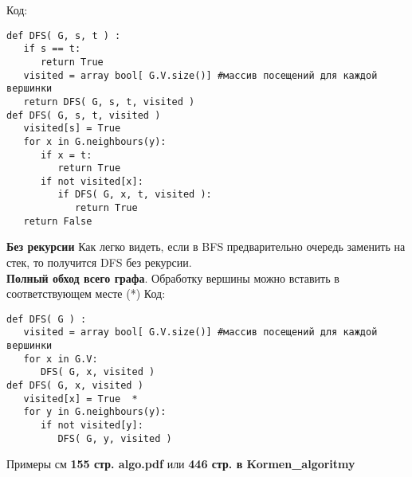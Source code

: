 Код:
\begin{verbatim}
def DFS( G, s, t ) :
   if s == t:
      return True
   visited = array bool[ G.V.size()] #массив посещений для каждой вершинки
   return DFS( G, s, t, visited )
def DFS( G, s, t, visited )
   visited[s] = True
   for x in G.neighbours(y):
      if x = t:
         return True
      if not visited[x]:
         if DFS( G, x, t, visited ):
            return True
   return False
\end{verbatim}
{\bf Без рекурсии} Как легко видеть, если в BFS предварительно очередь заменить на стек, то получится DFS без рекурсии.\\
{\bf Полный обход всего графа}. Обработку вершины можно вставить в соответствующем месте (*) Код:
\begin{verbatim}
def DFS( G ) :
   visited = array bool[ G.V.size()] #массив посещений для каждой вершинки
   for x in G.V:
      DFS( G, x, visited )
def DFS( G, x, visited )
   visited[x] = True  *
   for y in G.neighbours(y):
      if not visited[y]:
         DFS( G, y, visited )
\end{verbatim}

Примеры см {\bf 155 стр. algo.pdf} или {\bf 446 стр. в Kormen\_algoritmy}
